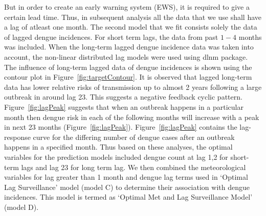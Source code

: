 \documentclass{bmcart}
\begin{document}
But in order to create an early warning system (EWS), it is required to give a certain lead time. Thus, in subsequent analysis all the data that we use shall have a lag of atleast one month. The second model that we fit consists solely the data of lagged dengue incidences. For short term lags, the data from past $1-4$ months was included. When the long-term lagged dengue incidence data was taken into account, the non-linear distributed lag models were used using dlnm package\cite{gasparrini2011distributed}. The influence of long-term lagged data of dengue incidences is shown using the contour plot in Figure~\ref{fig:targetContour}. It is observed that lagged long-term data has lower relative risks of transmission up to almost 2 years following a large outbreak in around lag 23. This suggests a negative feedback cyclic pattern. Figure~\ref{fig:lagPeak} suggests that when an outbreak happens in a particular month then dengue risk in each of the following months will increase with a peak in next 23 months (Figure~\ref{fig:lagPeak}). %
Figure~\ref{fig:lagPeak} contains the lag-response curve for the differing number of dengue cases after an outbreak happens in a specified month. Thus based on these  analyses, the optimal variables for the prediction models included dengue count at lag 1,2 for short-term lags and lag 23 for long term lag. We then combined the meteorological variables for lag greater than 1 month and dengue lag terms used in `Optimal Lag Surveillance' model (model C) to determine their association with dengue incidences. This model is termed as `Optimal Met and Lag Surveillance Model' (model D). 
\end{document}
